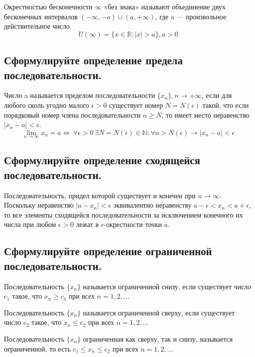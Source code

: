     Окрестностью бесконечности $\infty$ «без знака»  называют объединение двух бесконечных интервалов 
    $(-\infty, -a) \cup (a, +\infty)$, где a — произвольное действительное число.
    $$U(\infty) = \{x \in \mathbb{R}: |x| > a\}, a > 0$$

    \subsection{Сформулируйте определение предела последовательности.}
    
    Число a называется пределом последовательности $\{x_n\}, n \to +\infty$, если для любого 
    сколь угодно малого $\epsilon > 0$ существует номер $N = N(\epsilon)$ такой, что 
    если порядковый номер члена последовательности $n  \geqslant  N$, то имеет место неравенство 
    $|x_n - a| < \epsilon$. 
    $$\lim\limits_{n \to \infty} x_n = a \iff \ \forall \epsilon > 0 \  \exists N = N(\epsilon) \in 
    \mathbb{N} : \forall n > N(\epsilon) \longrightarrow |x_n - a| < \epsilon$$
    
    \subsection{Сформулируйте определение сходящейся последовательности.}

    Последовательность, придел которой существует и конечен при $n \to \infty$. Поскольку 
    неравенство $|a - x_n| < \epsilon$ эквивалентно неравенству 
    $a - \epsilon < x_n < a + \epsilon$, то все элементы сходящейся последовательности 
    за исключением конечного их числа при любом $\epsilon > 0$ лежат в $\epsilon$-окрестности 
    точки $a$.

    \subsection{Сформулируйте определение ограниченной последовательности.}

    Последовательность $\{x_n\}$ называется ограниченной снизу, если существует число $c_1$
    такое, что $x_n  \geqslant  c_1$ при всех $n = 1, 2, ...$

    Последовательность $\{x_n\}$ называется ограниченной сверху, если существует число $c_2$
    такое, что $x_n  \leqslant  c_2$ при всех $n = 1, 2, ...$

    Последовательность $\{x_n\}$ ограниченная как сверху, так и снизу, называется ограниченной,
    то есть $c_1  \leqslant  x_n  \leqslant  c_2$ при всех $n = 1, 2, ...$

